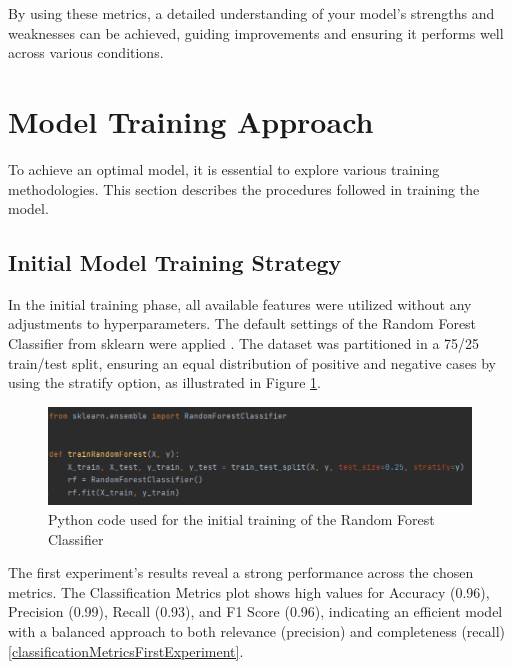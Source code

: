 By using these metrics, a detailed understanding of your model's strengths and weaknesses can be achieved, guiding improvements and ensuring it performs well across various conditions.

\section{Model Training Approach}

\quad To achieve an optimal model, it is essential to explore various training methodologies. This section describes the procedures followed in training the model.

\subsection{Initial Model Training Strategy}

\quad In the initial training phase, all available features were utilized without any adjustments to hyperparameters. The default settings of the Random Forest Classifier from sklearn were applied \cite{sklearn_api}. The dataset was partitioned in a 75/25 train/test split, ensuring an equal distribution of positive and negative cases by using the stratify option, as illustrated in Figure \ref{codeTrainRF}.

\begin{figure}[htbp]
	\centering
		\includegraphics[scale=0.6]{LaTeX Bachelor Thesis Depression Signs Detection/figures/codeTrainingRF.png}
	\caption{Python code used for the initial training of the Random Forest Classifier}
	\label{codeTrainRF}
\end{figure}

The first experiment's results reveal a strong performance across the chosen metrics. The Classification Metrics plot shows high values for Accuracy (0.96), Precision (0.99), Recall (0.93), and F1 Score (0.96), indicating an efficient model with a balanced approach to both relevance (precision) and completeness (recall) \ref{classificationMetricsFirstExperiment}.

